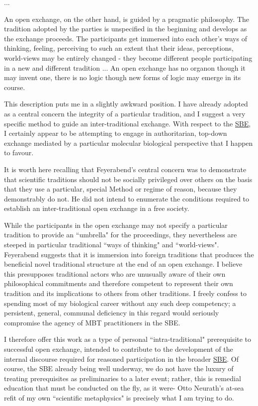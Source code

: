\begin{enumerate}
\begin{longquote}
...

An open exchange, on the other hand, is guided by a pragmatic
philosophy. The tradition adopted by the parties is unspecified in the
beginning and develops as the exchange proceeds. The participants
get immersed into each other's ways of thinking, feeling, perceiving
to such an extent that their ideas, perceptions, world-views may be
entirely changed - they become different people participating in a
new and different tradition ... An open exchange has no organon though it may invent one,
there is no logic though new forms of logic may emerge in its course.
\end{longquote}

This description puts me in a slightly awkward position. I have already adopted as a central concern the integrity of a particular tradition, and I suggest a very specific method to guide an inter-traditional exchange. With respect to the \hyperref[SBE]{SBE}, I certainly appear to be attempting to engage in authoritarian, top-down exchange mediated by a particular molecular biological perspective that I happen to favour.

It is worth here recalling that Feyerabend's central concern was to demonstrate that scientific traditions should not be socially privileged over others on the basis that they use a particular, special Method or regime of reason, because they demonstrably do not. He did not intend to enumerate the conditions required to establish an inter-traditional open exchange in a free society.

 While the participants in the open exchange may not specify a particular tradition to provide an ``umbrella" for the proceedings, they nevertheless are steeped in particular traditional ``ways of thinking" and ``world-views". Feyerabend suggests that it is immersion into foreign traditions that produces the beneficial novel traditional structure at the end of an open exchange. I believe this presupposes traditional actors who are unusually aware of their own philosophical commitments and therefore competent to represent their own tradition and its implications to others from other traditions. I freely confess to spending most of my biological career without any such deep competency; a persistent, general, communal deficiency in this regard would seriously compromise the agency of MBT practitioners in the SBE.

 I therefore offer this work as a type of personal ``intra-traditional" prerequisite to successful open exchange, intended to contribute to the development of the internal discourse required for reasoned participation in the broader \hyperref[SBE]{SBE}. Of course, the SBE already being well underway, we do not have the luxury of treating prerequisites as preliminaries to a later event; rather, this is remedial education that must be conducted on the fly, as it were- Otto Neurath's at-sea refit of my own ``scientific metaphysics" is precisely what I am trying to do.
\end{enumerate}



